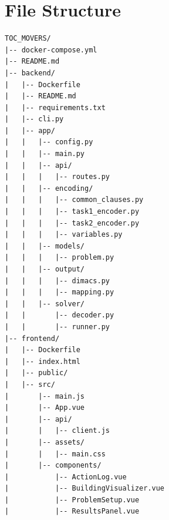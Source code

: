 \section{File Structure} \label{sec:file-structure}

\begin{lstlisting}[label={lst:folder-structure}]
TOC_MOVERS/
|-- docker-compose.yml
|-- README.md
|-- backend/
|   |-- Dockerfile
|   |-- README.md
|   |-- requirements.txt
|   |-- cli.py
|   |-- app/
|   |   |-- config.py
|   |   |-- main.py
|   |   |-- api/
|   |   |   |-- routes.py
|   |   |-- encoding/
|   |   |   |-- common_clauses.py
|   |   |   |-- task1_encoder.py
|   |   |   |-- task2_encoder.py
|   |   |   |-- variables.py
|   |   |-- models/
|   |   |   |-- problem.py
|   |   |-- output/
|   |   |   |-- dimacs.py
|   |   |   |-- mapping.py
|   |   |-- solver/
|   |       |-- decoder.py
|   |       |-- runner.py
|-- frontend/
|   |-- Dockerfile
|   |-- index.html
|   |-- public/
|   |-- src/
|       |-- main.js
|       |-- App.vue
|       |-- api/
|       |   |-- client.js
|       |-- assets/
|       |   |-- main.css
|       |-- components/
|           |-- ActionLog.vue
|           |-- BuildingVisualizer.vue
|           |-- ProblemSetup.vue
|           |-- ResultsPanel.vue
\end{lstlisting}
